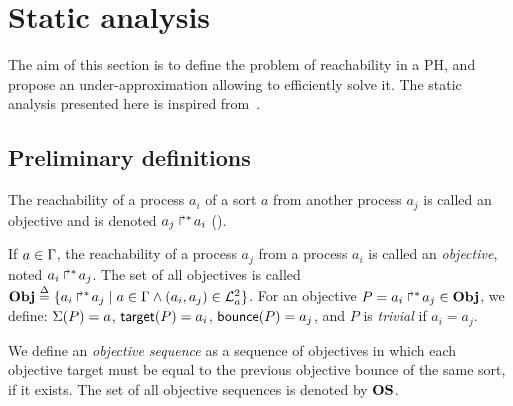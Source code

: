 \section{Static analysis}\label{sec:sa}

The aim of this section is to define the problem of reachability in a PH,
and propose an under-approximation allowing to efficiently solve it.
The static analysis presented here is inspired from~\cite{PMR12-MSCS}.

\subsection{Preliminary definitions}
\label{ssec:sa-def}

The reachability of a process $a_i$ of a sort $a$ from another process $a_j$ is called an objective and is denoted $\mbox{${a}_{j}\Rsh^*\!{a}_{i}$}$ ().
\begin{definition}
\label{def:obj}
  If $a \in \Gamma$, the reachability of a process $a_j$ from a process $a_i$ is called an \emph{objective}, noted $\mbox{$a_i\Rsh^*\!a_j$}$.
  The set of all objectives is called $\mathbf{Obj} \stackrel{\Delta}= \{ \mbox{$a_i\Rsh^*\!a_j$} \mid a \in \Gamma \wedge (a_i, a_j) \in \mathcal{L}_a^2 \}$.
  For an objective $P = \mbox{$a_i\Rsh^*\!a_j$} \in \mathbf{Obj}$, we define: $\Sigma(P) = a$, $\mathsf{target}(P)=a_i$, $\mathsf{bounce}(P)=a_j$,
  and $P$ is \emph{trivial} if $a_i = a_j$.
\end{definition}
\noindent
We define an \emph{objective sequence} as a sequence of objectives in which each objective target must be equal to the previous objective bounce of the same sort, if it exists.
The set of all objective sequences is denoted by $\mathbf{OS}$.

